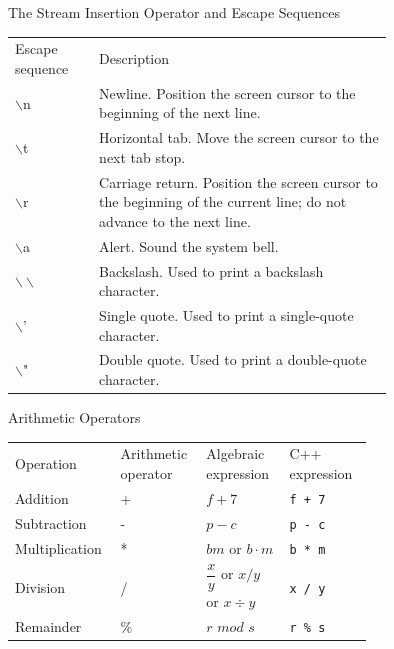 \documentclass[10pt]{beamer}
\begin{document}
\begin{frame}{\small The Stream Insertion Operator and Escape Sequences}
	\centering\tiny\renewcommand{\arraystretch}{2}	
\begin{tabular}{p{0.15\linewidth} p{0.6\linewidth}}
	\rowcolor{cyan}\color{white} Escape sequence & \color{white} Description \\
	
	\rowcolor{lightcyan} $\backslash$n & Newline. Position the screen cursor to the beginning of the next line.\\ 
	
	\rowcolor{lightcyan} $\backslash$t & Horizontal tab. Move the screen cursor to the next tab stop.\\ 
	
	\rowcolor{lightcyan} $\backslash$r & Carriage return. Position the screen cursor to the beginning of the current line; do not advance to the next line.\\ 
	
	\rowcolor{lightcyan} $\backslash$a & Alert. Sound the system bell.\\ 
	
	\rowcolor{lightcyan} $\backslash\backslash$ & Backslash. Used to print a backslash character.\\ 
	
	\rowcolor{lightcyan} $\backslash$' & Single quote. Used to print a single-quote character.\\ 
	
	\rowcolor{lightcyan} $\backslash$" & Double quote. Used to print a double-quote character.
\end{tabular}
\end{frame}


\begin{frame}{\small Arithmetic Operators}
	\centering\tiny\renewcommand{\arraystretch}{2}
	\begin{tabular}{p{0.15\linewidth} p{0.16\linewidth} p{0.2\linewidth} p{0.2\linewidth}}
		
		\rowcolor{cyan}\color{white} Operation & \color{white} Arithmetic operator & \color{white} Algebraic expression & \color{white} C++ expression \\
		
		\rowcolor{lightcyan} Addition & + & $f + 7$ & \texttt{f + 7} \\
		
		\rowcolor{lightcyan} Subtraction & - & $p - c$ & \texttt{p - c} \\
		
		\rowcolor{lightcyan} Multiplication & * & $bm$ or $b \cdot m$ & \texttt{b * m} \\
		
		\rowcolor{lightcyan} Division & / & $\dfrac{x}{y}$ or $x/y$ or $x\div y$ & \texttt{x / y} \\
		
		\rowcolor{lightcyan} Remainder & \% & $r$ $mod$ $s$ & \texttt{r \% s} 
	\end{tabular}
\end{frame}
\end{document}
